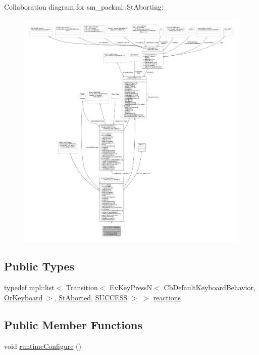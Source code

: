 Collaboration diagram for sm\+\_\+packml\+:\+:St\+Aborting\+:
\nopagebreak
\begin{figure}[H]
\begin{center}
\leavevmode
\includegraphics[width=350pt]{structsm__packml_1_1StAborting__coll__graph}
\end{center}
\end{figure}
\subsection*{Public Types}
\begin{DoxyCompactItemize}
\item 
typedef mpl\+::list$<$ Transition$<$ Ev\+Key\+PressN$<$ Cb\+Default\+Keyboard\+Behavior, \hyperlink{classsm__packml_1_1OrKeyboard}{Or\+Keyboard} $>$, \hyperlink{structsm__packml_1_1StAborted}{St\+Aborted}, \hyperlink{classSUCCESS}{S\+U\+C\+C\+E\+SS} $>$ $>$ \hyperlink{structsm__packml_1_1StAborting_a11d6f3f4d621d1bffb086734bbf70c49}{reactions}
\end{DoxyCompactItemize}
\subsection*{Public Member Functions}
\begin{DoxyCompactItemize}
\item 
void \hyperlink{structsm__packml_1_1StAborting_a6b4c9fc5bec941da54df5802cb0ee60d}{runtime\+Configure} ()
\end{DoxyCompactItemize}
